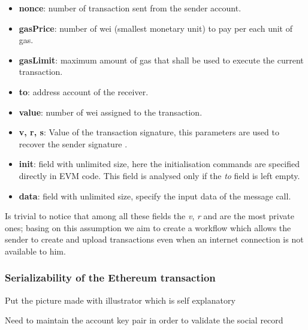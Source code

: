 \begin{itemize}
  \item \textbf{nonce}: number of transaction sent from the sender account.
  \item \textbf{gasPrice}: number of wei (smallest monetary unit) to pay per each unit of gas.
  \item \textbf{gasLimit}: maximum amount of gas that shall be used to execute the current transaction.
  \item \textbf{to}: address account of the receiver.
  \item \textbf{value}: number of wei assigned to the transaction.
  \item \textbf{v, r, s}: Value of the transaction signature, this parameters are used to recover the sender signature \cite{gura2004comparing}.
  \item \textbf{init}: field with unlimited size, here the initialisation commands are specified directly in EVM code. This field is analysed only if the \textit{to} field is left empty.
  \item \textbf{data}: field with unlimited size, specify the input data of the message call.
\end{itemize}

Is trivial to notice that among all these fields the \textit{v}, \textit{r} and  are the most private ones; basing on this assumption we aim to create a workflow which allows the sender to create and upload transactions even when an internet connection is not available to him. 

\subsubsection{Serializability of the Ethereum transaction}



Put the picture made with illustrator which is self explanatory 

\begin{notation}
  Need to maintain the account key pair in order to validate the social record
\end{notation}